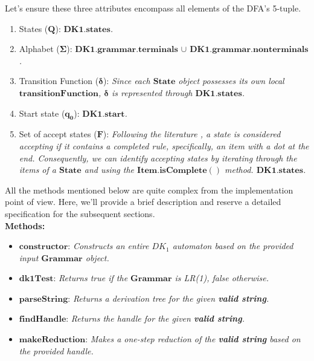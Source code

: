 Let's ensure these three attributes encompass all elements of the DFA's 5-tuple.

\begin{enumerate}
    \item States (\(\boldsymbol{Q}\)):  \textit{\(\boldsymbol{DK1.states}\).}
    \item Alphabet (\(\boldsymbol{\Sigma}\)):  \textit{\(\boldsymbol{DK1.grammar.terminals}\) \(\cup\) \(\boldsymbol{DK1.grammar.nonterminals}\).}
    \item Transition Function (\(\boldsymbol{\delta}\)):  \textit{Since each \(\boldsymbol{State}\) object possesses its own local \(\boldsymbol{transitionFunction}\), \(\boldsymbol{\delta}\) is represented through \(\boldsymbol{DK1.states}\).}
    \item Start state (\(\boldsymbol{q_{0}}\)):  \textit{\(\boldsymbol{DK1.start}\).}
    \item Set of accept states (\(\boldsymbol{F}\)):  \textit{Following the literature \cite{sipser}, a state is considered accepting if it contains a completed rule, specifically, an item with a dot at the end. Consequently, we can identify accepting states by iterating through the items of a \(\boldsymbol{State}\) and using the \(\boldsymbol{Item.isComplete()}\) method. \(\boldsymbol{DK1.states}\).}
\end{enumerate}

All the methods mentioned below are quite complex from the implementation point of view. Here, we'll provide a brief description and reserve a detailed specification for the subsequent sections.\\

\textbf{Methods:}
\begin{itemize}
    \item \(\boldsymbol{constructor}\): \textit{Constructs an entire \(DK_{1}\) automaton based on the provided input \(\boldsymbol{Grammar}\) object.}
    \item \(\boldsymbol{dk1Test}\): \textit{Returns true if the \(\boldsymbol{Grammar}\) is LR(1), false otherwise.}
    \item \(\boldsymbol{parseString}\): \textit{Returns a derivation tree for the given \textbf{valid string}.}
    \item \(\boldsymbol{findHandle}\): \textit{Returns the handle for the given \textbf{valid string}.}
    \item \(\boldsymbol{makeReduction}\): \textit{Makes a one-step reduction of the \textbf{valid string} based on the provided handle.}
\end{itemize}

